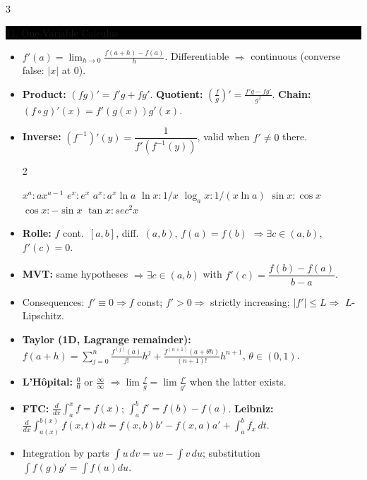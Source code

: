 \documentclass[8pt,letterpaper]{article}
\makeatletter
\newcommand{\sect}[1]{%
  \vspace{2.2pt}%
  \noindent\colorbox{black}{\parbox{\dimexpr\linewidth-2\fboxsep}{%
    \color{white}\bfseries\scshape\fontsize{6.4}{7.4}\selectfont
    \hyphenpenalty=10000\exhyphenpenalty=10000\raggedright #1}}%
  \vspace{1.4pt}\par\nopagebreak\@afterheading}
\newenvironment{tl}
  {\begin{itemize}[leftmargin=6pt,itemsep=0.3pt,topsep=1pt,parsep=0pt,
                   partopsep=0pt,label=\textcolor{gray}{\tiny$\bullet$}]}
  {\end{itemize}}
\makeatother
\begin{document}
\begin{multicols}{3}
\sect{11. One-Variable Calculus}
\begin{tl}
\item $f'(a)=\lim_{h\to0}\frac{f(a+h)-f(a)}{h}$. Differentiable $\Rightarrow$ continuous (converse false: $|x|$ at $0$).
\item \textbf{Product:} $(fg)'=f'g+fg'$. \textbf{Quotient:} $\left(\frac fg\right)'=\frac{f'g-fg'}{g^2}$. \textbf{Chain:} $(f\circ g)'(x)=f'(g(x))g'(x)$.
\item \textbf{Inverse:} $(f^{-1})'(y)=\dfrac{1}{f'(f^{-1}(y))}$, valid when $f'\ne0$ there.

{\setlength{\multicolsep}{0pt} %
\begin{multicols}{2}
\begin{itemize}
     $x^a: ax^{a-1}$
     $e^x: e^x$
     $a^x: a^x\ln a$
     $\ln x: 1/x$
     $\log_a x: 1/(x\ln a)$
     $\sin x: \cos x$
     $\cos x: -\sin x$
     $\tan x: sec^{2}x$ 
\end{itemize}
\end{multicols}}
    
\item \textbf{Rolle:} $f$ cont.\ $[a,b]$, diff.\ $(a,b)$, $f(a)=f(b)$ $\Rightarrow\exists c\in(a,b)$, $f'(c)=0$.
\item \textbf{MVT:} same hypotheses $\Rightarrow\exists c\in(a,b)$ with $f'(c)=\dfrac{f(b)-f(a)}{b-a}$.
\item Consequences: $f'\equiv0\Rightarrow f$ const; $f'>0\Rightarrow$ strictly increasing; $|f'|\le L\Rightarrow$ $L$-Lipschitz.
\item \textbf{Taylor (1D, Lagrange remainder):} $f(a+h)=\sum_{j=0}^{n}\frac{f^{(j)}(a)}{j!}h^j+\frac{f^{(n+1)}(a+\theta h)}{(n+1)!}h^{n+1}$, $\theta\in(0,1)$.
\item \textbf{L'H\^opital:} $\frac00$ or $\frac\infty\infty$ $\Rightarrow\lim\frac fg=\lim\frac{f'}{g'}$ when the latter exists.
\item \textbf{FTC:} $\frac{d}{dx}\int_a^xf=f(x)$; $\int_a^bf'=f(b)-f(a)$. \textbf{Leibniz:} $\frac{d}{dx}\int_{a(x)}^{b(x)}f(x,t)dt=f(x,b)b'-f(x,a)a'+\int_a^b f_x\,dt$.
\item Integration by parts $\int u\,dv=uv-\int v\,du$; substitution $\int f(g)g'=\int f(u)du$.
\end{tl}


\end{multicols}
\end{document}
